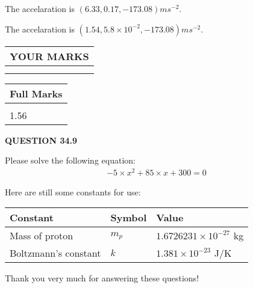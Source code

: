 \documentclass[12pt]{article}
\begin{document}
 
  The accelaration is $  %
(
6.33,
0.17,
-173.08)
ms^{-2} $.
 
 
  The accelaration is $  %
(
1.54,
5.8 \times 10^{-2},
-173.08)
ms^{-2} $.
 
 
 

 
 
\vspace{0.3in}
  
\vspace{0.2in}
  
\noindent\begin{tabular}{|l|}
\hline
 YOUR MARKS  \\
\hline
 \\ 
 \\ 
\hline
\end{tabular}
\hspace{0.05in} \begin{tabular}{|l|}
\hline
 Full Marks  \\
\hline
 \\ 
1.56 \\
\hline
\end{tabular}
{\textbf{\Large{QUESTION
34.9 
}}}
  
  
 
 

 
Please solve the following equation:
\begin{eqnarray*}
-5 \times x^2  %
+  %
85
                 \times x    %
+  %
300 =0
\end{eqnarray*}
 

 

 
\vspace{0.3in}
   
   
 \vspace{0.2in}
Here are still some constants for use:
 
 
\noindent\begin{tabular}{|l|l|l|}
\hline
Constant & Symbol & Value \\
\hline
 
Mass of proton &
$m_p$ &
 $ 1.6726231 \times 10^{-27} $
kg \\
\hline
 
Boltzmann's constant &
$k$ &
 $ 1.381 \times 10^{-23} $
J/K \\
\hline
 
\end{tabular}
 
Thank you very much for answering these questions!
 
\end{document}

